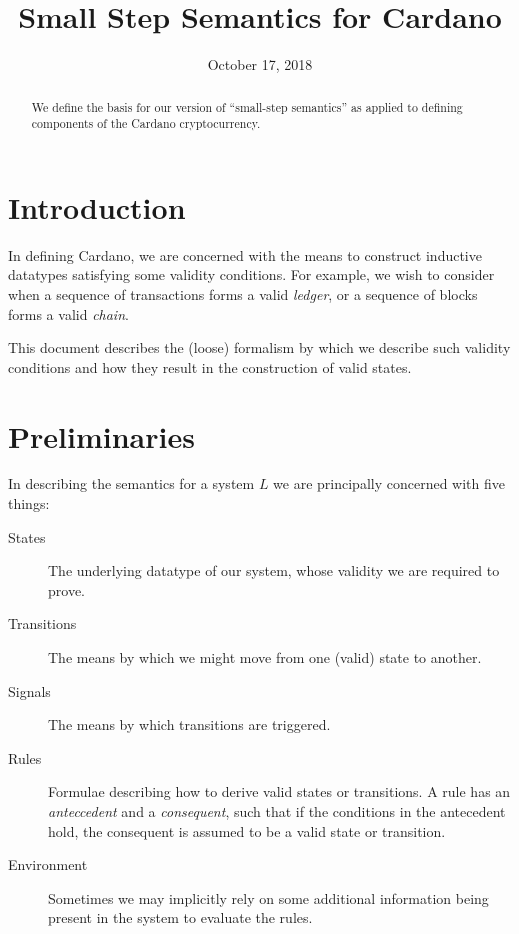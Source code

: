 \documentclass[11pt,a4paper]{article}
\theoremstyle{definition}
\theoremstyle{remark}
\begin{document}
\title{Small Step Semantics for Cardano}
\author{}
\date{October 17, 2018}

\maketitle

\begin{abstract}
We define the basis for our version of ``small-step semantics'' as applied to
defining components of the Cardano cryptocurrency.
\end{abstract}

\section{Introduction}
\label{sec:introduction}

In defining Cardano, we are concerned with the means to construct inductive
datatypes satisfying some validity conditions. For example, we wish to consider
when a sequence of transactions forms a valid \textit{ledger}, or a sequence of
blocks forms a valid \textit{chain}.

This document describes the (loose) formalism by which we describe such validity
conditions and how they result in the construction of valid states.

\section{Preliminaries}
\label{sec:preliminaries}

In describing the semantics for a system $L$ we are principally concerned with
five things:

\begin{description}
\item [States] The underlying datatype of our system, whose validity we are
  required to prove.
\item [Transitions] The means by which we might move from one (valid) state to
  another.
\item [Signals] The means by which transitions are triggered.
\item [Rules] Formulae describing how to derive valid states or transitions. A
  rule has an \textit{anteccedent} and a \textit{consequent}, such that if the
  conditions in the antecedent hold, the consequent is assumed to be a valid
  state or transition.
\item [Environment] Sometimes we may implicitly rely on some additional
  information being present in the system to evaluate the rules.
\end{description}
\end{document}
